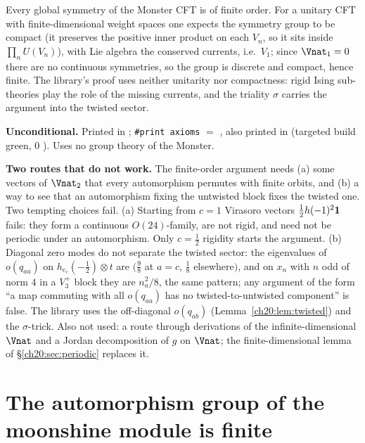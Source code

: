 \begin{physics}
Every global symmetry of the Monster CFT is of finite order.  For a unitary CFT with finite-dimensional weight spaces one
expects the symmetry group to be compact (it preserves the positive inner product on each $V_n$, so it sits inside
$\prod_nU(V_n)$), with Lie algebra the conserved currents, i.e.\ $V_1$; since $\Vnat_1=0$ there are no continuous symmetries,
so the group is discrete and compact, hence finite.  The library's proof uses neither unitarity nor compactness: rigid
Ising sub-theories play the role of the missing currents, and the triality $\sigma$ carries the argument into the twisted
sector.
\end{physics}
\begin{status}
\textbf{Unconditional.}  Printed in ; \texttt{\#print axioms} $=$
, also printed in 
(targeted build green, 0 ).  Uses no group theory of the Monster.
\end{status}

\begin{warning}
\textbf{Two routes that do not work.}  The finite-order argument needs (a) some
vectors of $\Vnat_2$ that every automorphism permutes with finite orbits, and (b) a way to see that an automorphism fixing the
untwisted block fixes the twisted one.  Two tempting choices fail.  (a) Starting from $c=1$ Virasoro vectors
$\tfrac12h(-1)^2\mathbf 1$ fails: they form a continuous $O(24)$-family, are not rigid, and need not be periodic under
an automorphism.  Only $c=\tfrac12$ rigidity starts the argument.  (b) Diagonal zero modes do not separate the twisted sector:
the eigenvalues of $o(q_{aa})$ on $h_{e_c}(-\tfrac12)\otimes t$ are $(\tfrac98$ at $a=c$, $\tfrac18$ elsewhere$)$, and on $x_n$
with $n$ odd of norm $4$ in a $V_3^+$ block they are $n_a^2/8$, the same pattern; any argument of the form ``a map commuting
with all $o(q_{aa})$ has no twisted-to-untwisted component'' is false.  The library uses the off-diagonal $o(q_{ab})$
(Lemma~\ref{ch20:lem:twisted}) and the $\sigma$-trick.  Also not used: a route through derivations of the
infinite-dimensional $\Vnat$ and a Jordan decomposition of $g$ on $\Vnat$; the finite-dimensional lemma of
\S\ref{ch20:sec:periodic} replaces it.
\end{warning}

\section{The automorphism group of the moonshine module is finite}\label{ch20:sec:finite}

